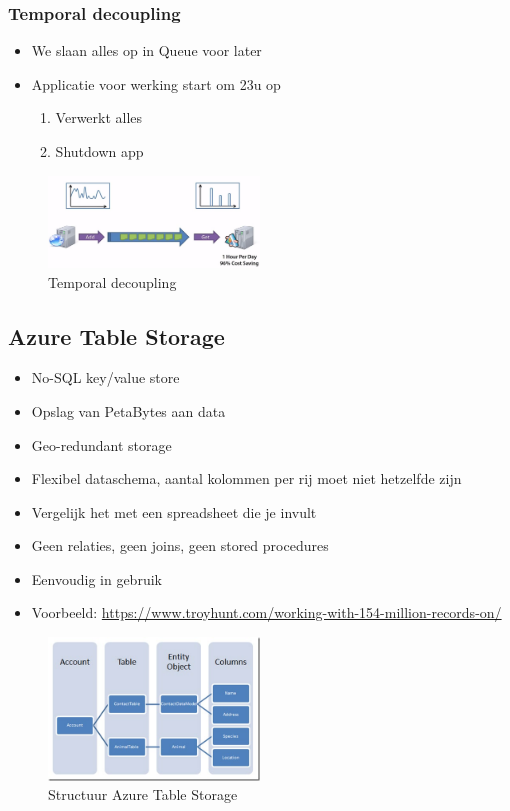 \documentclass{article}
\begin{document}
\subsubsection{Temporal decoupling}

\begin{itemize}
    \item We slaan alles op in Queue voor later
    \item Applicatie voor werking start om 23u op
    \begin{enumerate}
        \item Verwerkt alles
        \item Shutdown app
    \end{enumerate}
\end{itemize}

\begin{figure}[H]
    \centering
    \includegraphics[width=0.5\textwidth]{temporal-decoupling.png}
    \caption{Temporal decoupling}
\end{figure}

\subsection{Azure Table Storage}

\begin{itemize}
    \item No-SQL key/value store
    \item Opslag van PetaBytes aan data
    \item Geo-redundant storage
    \item Flexibel dataschema, aantal kolommen per rij moet niet hetzelfde zijn
    \item Vergelijk het met een spreadsheet die je invult
    \item Geen relaties, geen joins, geen stored procedures
    \item Eenvoudig in gebruik
    \item Voorbeeld: \url{https://www.troyhunt.com/working-with-154-million-records-on/}
\end{itemize}

\begin{figure}[H]
    \centering
    \includegraphics[width=0.5\textwidth]{azure-storage-table.png}
    \caption{Structuur Azure Table Storage}
\end{figure}
\end{document}
